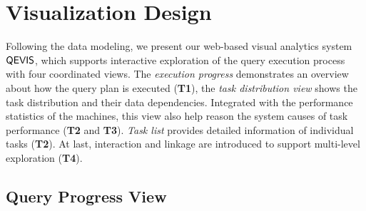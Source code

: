 
\section{Visualization Design}

Following the data modeling, we present our web-based visual analytics system $\mathsf{QEVIS}$, which supports interactive exploration of the query execution process with four coordinated views. The \textit{execution progress} demonstrates an overview about how the query plan is executed (\textbf{T1}), the \textit{task distribution view} shows the task distribution and their data dependencies. Integrated with the performance statistics of the machines, this view also help reason the system causes of task performance (\textbf{T2} and \textbf{T3}). \textit{Task list} provides detailed information of individual tasks (\textbf{T2}).  At last, interaction and linkage are introduced to support multi-level exploration (\textbf{T4}).

\subsection{Query Progress View}\label{sec:queryprogress}


